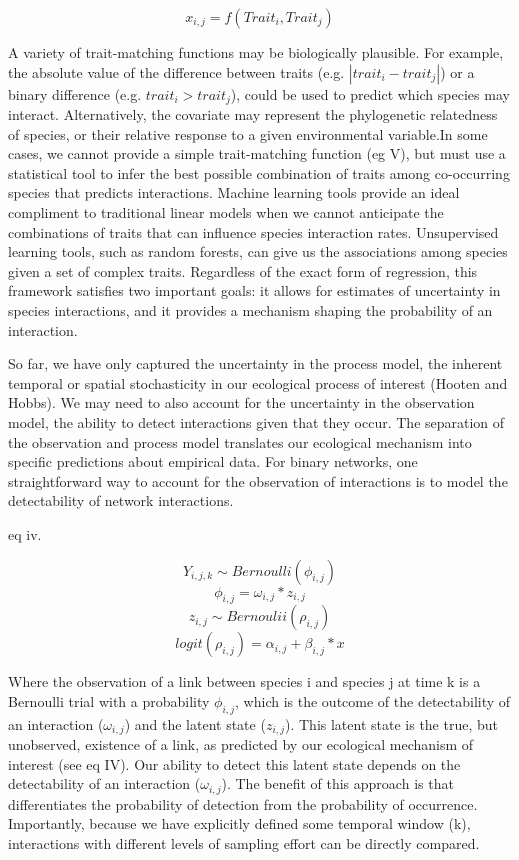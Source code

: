 \[x_{i,j}= f(Trait_i,Trait_j)\]

A variety of trait-matching functions may be biologically plausible. For
example, the absolute value of the difference between traits (e.g. \(|trait_i -
trait_j|\)) or a binary difference (e.g. \(trait_i > trait_j\)), could be used
to predict which species may interact. Alternatively, the covariate may
represent the phylogenetic relatedness of species, or their relative response to
a given environmental variable.In some cases, we cannot provide a simple
trait-matching function (eg V), but must use a statistical tool to infer the
best possible combination of traits among co-occurring species that predicts
interactions. Machine learning tools provide an ideal compliment to traditional
linear models when we cannot anticipate the combinations of traits that can
influence species interaction rates. Unsupervised learning tools, such as random
forests, can give us the associations among species given a set of complex
traits. Regardless of the exact form of regression, this framework satisfies two
important goals: it allows for estimates of uncertainty in species interactions,
and it provides a mechanism shaping the probability of an interaction.

So far, we have only captured the uncertainty in the process model, the inherent
temporal or spatial stochasticity in our ecological process of interest (Hooten
and Hobbs). We may need to also account for the uncertainty in the observation
model, the ability to detect interactions given that they occur. The separation
of the observation and process model translates our ecological mechanism into
specific predictions about empirical data. For binary networks, one
straightforward way to account for the observation of interactions is to model
the detectability of network interactions.

eq iv.

\[ Y_{i,j,k} \sim Bernoulli(\phi_{i,j})\] \[ \phi_{i,j} = \omega_{i,j} *
z_{i,j}\] \[z_{i,j} \sim Bernoulii(\rho_{i,j})\] \[ logit(\rho_{i,j}) =
\alpha_{i,j} + \beta_{i,j} * x \]

Where the observation of a link between species i and species j at time k is a
Bernoulli trial with a probability \(\phi_{i,j}\), which is the outcome of the
detectability of an interaction (\(\omega_{i,j}\)) and the latent state
(\(z_{i,j}\)). This latent state is the true, but unobserved, existence of a
link, as predicted by our ecological mechanism of interest (see eq IV). Our
ability to detect this latent state depends on the detectability of an
interaction (\(\omega_{i,j}\)). The benefit of this approach is that
differentiates the probability of detection from the probability of occurrence.
Importantly, because we have explicitly defined some temporal window (k),
interactions with different levels of sampling effort can be directly compared.

